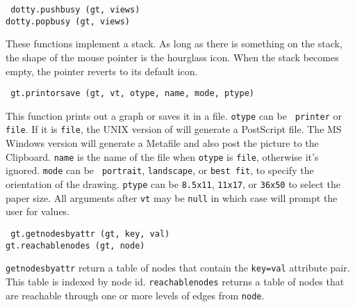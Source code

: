 \begin{flushleft}\tt
dotty.pushbusy (gt, views)\\
dotty.popbusy (gt, views)\\
\end{flushleft}\vspace{-2\itemsep}
These functions implement a stack. As long as there is something on the stack,
the shape of the mouse pointer is the hourglass icon. When the stack becomes
empty, the pointer reverts to its default icon.

\begin{flushleft}\tt
gt.printorsave (gt, vt, otype, name, mode, ptype)\\
\end{flushleft}\vspace{-2\itemsep}
This function prints out a graph or saves it in a file. {\tt otype} can be {\tt
printer} or {\tt file}. If it is {\tt file}, the UNIX version of {\DOTTY} will
generate a PostScript file. The MS Windows version will generate a Metafile and
also post the picture to the Clipboard. {\tt name} is the name of the file when
{\tt otype} is {\tt file}, otherwise it's ignored.  {\tt mode} can be {\tt
portrait}, {\tt landscape}, or {\tt best fit}, to specify the orientation of
the drawing. {\tt ptype} can be {\tt 8.5x11}, {\tt 11x17}, or {\tt 36x50} to
select the paper size. All arguments after {\tt vt} may be {\tt null} in which
case {\DOTTY} will prompt the user for values.

\begin{flushleft}\tt
gt.getnodesbyattr (gt, key, val)\\
gt.reachablenodes (gt, node)\\
\end{flushleft}\vspace{-2\itemsep}
{\tt getnodesbyattr} return a table of nodes that contain the {\tt key=val}
attribute pair. This table is indexed by node id. {\tt reachablenodes} returns
a table of nodes that are reachable through one or more levels of edges from
{\tt node}.

